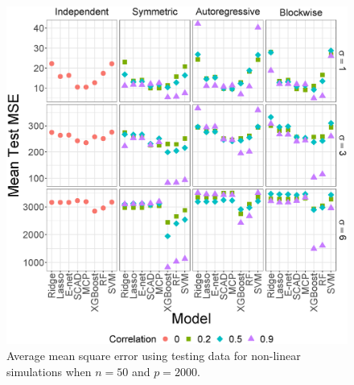 \documentclass{article}
\begin{document}
\begin{figure}[h!]
\begin{minipage}[t]{0.47\textwidth}
			\includegraphics[width = \textwidth]{images/facet/publication_facet_test_mse_2_50_2000.eps}
			\captionsetup{width = 0.95\textwidth}
			\caption{Average mean square error using testing data for non-linear simulations when $n = 50$ and $p = 	2000$.}
			\label{fig:nonlinear-test-mse}
		\end{minipage}
	\end{figure}
	
\end{document}
